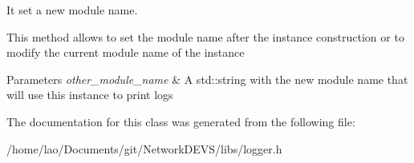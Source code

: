 It set a new module name. 

This method allows to set the module name after the instance construction or to modify the current module name of the instance


\begin{DoxyParams}{Parameters}
{\em other\+\_\+module\+\_\+name} & A std\+::string with the new module name that will use this instance to print logs \\
\hline
\end{DoxyParams}


The documentation for this class was generated from the following file\+:\begin{DoxyCompactItemize}
\item 
/home/lao/\+Documents/git/\+Network\+D\+E\+V\+S/libs/logger.\+h\end{DoxyCompactItemize}
